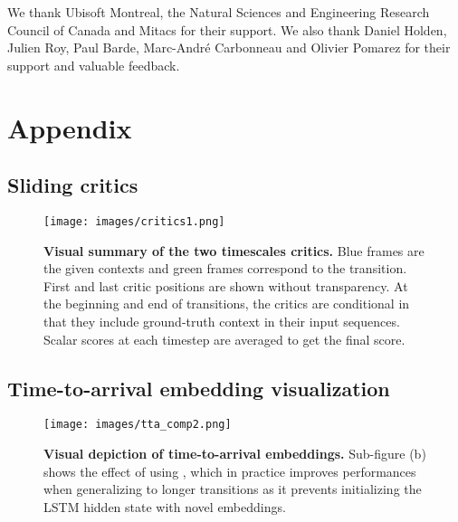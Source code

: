 \documentclass[acmtog]{acmart}
\begin{document}
\begin{acks}
We thank Ubisoft Montreal, the Natural Sciences and Engineering Research Council of Canada and Mitacs for their support. We also thank Daniel Holden, Julien Roy, Paul Barde, Marc-André Carbonneau and Olivier Pomarez for their support and valuable feedback.
\end{acks}







\appendix
\section{Appendix}
\subsection{Sliding critics}\label{app:critics}
\vskip -0.4cm
\begin{figure}[H]
\begin{center}
\centerline{\texttt{[image: images/critics1.png]}}
  \caption{\textbf{Visual summary of the two timescales critics.} Blue frames are the given contexts and green frames correspond to the transition. First and last critic positions are shown without transparency. At the beginning and end of transitions, the critics are conditional in that they include ground-truth context in their input sequences. Scalar scores at each timestep are averaged to get the final score.}
  \label{fig:critics}
\end{center}
\vspace{-0.5cm}
\end{figure}

\subsection{Time-to-arrival embedding visualization}\label{app:tta}
\vskip -0.4cm
\begin{figure}[H]
\begin{center}
\centerline{\texttt{[image: images/tta\_comp2.png]}}
  \caption{\textbf{Visual depiction of time-to-arrival embeddings.} Sub-figure (b) shows the effect of using , which in practice improves performances when generalizing to longer transitions as it prevents initializing the LSTM hidden state with novel embeddings.}
  \label{fig:tta}
\end{center}
\vspace{-0.5cm}
\end{figure}
\end{document}
